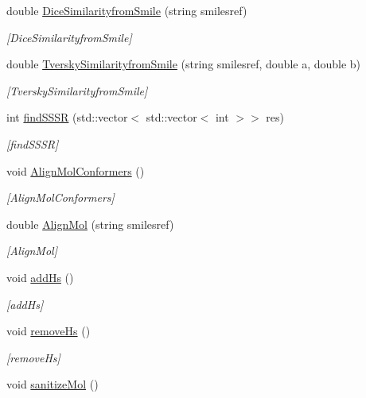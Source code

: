 \begin{DoxyCompactItemize}
double \hyperlink{class_molecule_a5dcf9622623a09d43d9a2bc9d381a67e}{Dice\+Similarityfrom\+Smile} (string smilesref)
\begin{DoxyCompactList}\small\item\em \mbox{[}Dice\+Similarityfrom\+Smile\mbox{]} \end{DoxyCompactList}\item 
double \hyperlink{class_molecule_ae2126d53ee2e1488eb7d105c6b02a604}{Tversky\+Similarityfrom\+Smile} (string smilesref, double a, double b)
\begin{DoxyCompactList}\small\item\em \mbox{[}Tversky\+Similarityfrom\+Smile\mbox{]} \end{DoxyCompactList}\item 
int \hyperlink{class_molecule_af3cf7c005e424e83f7c70fcf3a171b24}{find\+S\+S\+S\+R} (std\+::vector$<$ std\+::vector$<$ int $>$$>$ res)
\begin{DoxyCompactList}\small\item\em \mbox{[}find\+S\+S\+S\+R\mbox{]} \end{DoxyCompactList}\item 
void \hyperlink{class_molecule_adc6886a60ec1e7f55ba07d7f2be72e68}{Align\+Mol\+Conformers} ()
\begin{DoxyCompactList}\small\item\em \mbox{[}Align\+Mol\+Conformers\mbox{]} \end{DoxyCompactList}\item 
double \hyperlink{class_molecule_a8c47d44f8436cb7d3741af6aeb734a37}{Align\+Mol} (string smilesref)
\begin{DoxyCompactList}\small\item\em \mbox{[}Align\+Mol\mbox{]} \end{DoxyCompactList}\item 
void \hyperlink{class_molecule_a4113a3e70e7bc6d994bf7c8f14d94c9b}{add\+Hs} ()
\begin{DoxyCompactList}\small\item\em \mbox{[}add\+Hs\mbox{]} \end{DoxyCompactList}\item 
void \hyperlink{class_molecule_aff4e7702feb85eb5d43b5ae89a504ca3}{remove\+Hs} ()
\begin{DoxyCompactList}\small\item\em \mbox{[}remove\+Hs\mbox{]} \end{DoxyCompactList}\item 
void \hyperlink{class_molecule_a1d3b07d426af616e861606727848d35e}{sanitize\+Mol} ()
$$
\end{DoxyCompactItemize}
